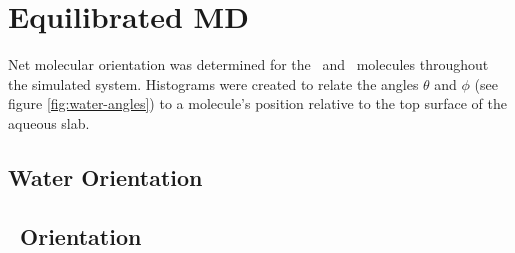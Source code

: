 \section{Equilibrated MD}

Net molecular orientation was determined for the \wat~and \suldiox~molecules throughout the simulated system. Histograms were created to relate the angles $\theta$ and $\phi$ (see figure \ref{fig:water-angles}) to a molecule's position relative to the top surface of the aqueous slab. 

\subsection{Water Orientation}



\subsection{\suldiox~Orientation}
